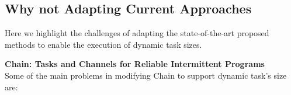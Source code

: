 \documentclass[pageno]{jpaper}
\begin{document}





\subsection{Why not Adapting Current Approaches}
Here we highlight the challenges of adapting the state-of-the-art proposed methods to enable the execution of dynamic task sizes. 
%


\noindent\textbf{Chain: Tasks and Channels for Reliable Intermittent Programs } \\
Some of the main problems in modifying Chain to support dynamic task's size are:
\end{document}
